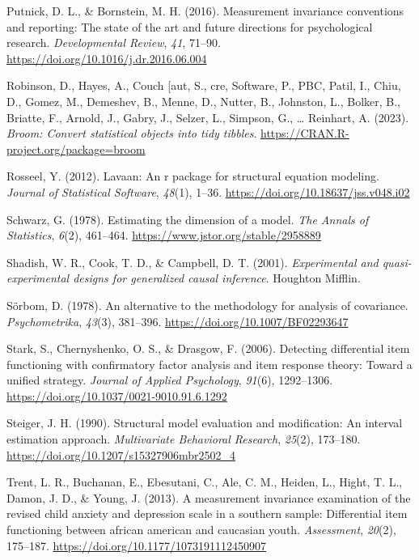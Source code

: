 \documentclass[
  man]{apa7}
\newlength{\cslhangindent}
\newlength{\cslentryspacingunit} %
\newenvironment{CSLReferences}[2] %
 {%
  \setlength{\parindent}{0pt}
  \ifodd #1
  \let\oldpar\par
  \def\par{\hangindent=\cslhangindent\oldpar}
  \fi
  \setlength{\parskip}{#2\cslentryspacingunit}
 }%
 {}
\begin{document}
\begin{CSLReferences}{1}{0}
\leavevmode{}%
Putnick, D. L., \& Bornstein, M. H. (2016). Measurement invariance conventions and reporting: The state of the art and future directions for psychological research. \emph{Developmental Review}, \emph{41}, 71--90. \url{https://doi.org/10.1016/j.dr.2016.06.004}

\leavevmode{}%
Robinson, D., Hayes, A., Couch {[}aut, S., cre, Software, P., PBC, Patil, I., Chiu, D., Gomez, M., Demeshev, B., Menne, D., Nutter, B., Johnston, L., Bolker, B., Briatte, F., Arnold, J., Gabry, J., Selzer, L., Simpson, G., \ldots{} Reinhart, A. (2023). \emph{Broom: Convert statistical objects into tidy tibbles}. \url{https://CRAN.R-project.org/package=broom}

\leavevmode{}%
Rosseel, Y. (2012). Lavaan: An r package for structural equation modeling. \emph{Journal of Statistical Software}, \emph{48}(1), 1--36. \url{https://doi.org/10.18637/jss.v048.i02}

\leavevmode{}%
Schwarz, G. (1978). Estimating the dimension of a model. \emph{The Annals of Statistics}, \emph{6}(2), 461--464. \url{https://www.jstor.org/stable/2958889}

\leavevmode{}%
Shadish, W. R., Cook, T. D., \& Campbell, D. T. (2001). \emph{Experimental and quasi-experimental designs for generalized causal inference}. Houghton Mifflin.

\leavevmode{}%
Sörbom, D. (1978). An alternative to the methodology for analysis of covariance. \emph{Psychometrika}, \emph{43}(3), 381--396. \url{https://doi.org/10.1007/BF02293647}

\leavevmode{}%
Stark, S., Chernyshenko, O. S., \& Drasgow, F. (2006). Detecting differential item functioning with confirmatory factor analysis and item response theory: Toward a unified strategy. \emph{Journal of Applied Psychology}, \emph{91}(6), 1292--1306. \url{https://doi.org/10.1037/0021-9010.91.6.1292}

\leavevmode{}%
Steiger, J. H. (1990). Structural model evaluation and modification: An interval estimation approach. \emph{Multivariate Behavioral Research}, \emph{25}(2), 173--180. \url{https://doi.org/10.1207/s15327906mbr2502_4}

\leavevmode{}%
Trent, L. R., Buchanan, E., Ebesutani, C., Ale, C. M., Heiden, L., Hight, T. L., Damon, J. D., \& Young, J. (2013). A measurement invariance examination of the revised child anxiety and depression scale in a southern sample: Differential item functioning between african american and caucasian youth. \emph{Assessment}, \emph{20}(2), 175--187. \url{https://doi.org/10.1177/1073191112450907}


\end{CSLReferences}
\end{document}
